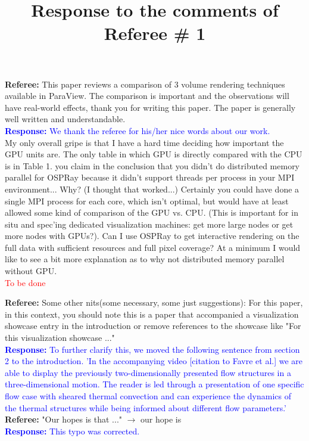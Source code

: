 \documentclass[]{article}
\title{Response to the comments of Referee \# 1}
\begin{document}
\maketitle
\textbf{Referee:} This paper reviews a comparison of 3 volume rendering techniques available in ParaView. The comparison is important and the observations will have real-world effects, thank you for writing this paper. The paper is generally well written and understandable. \\
\textcolor{blue}{\textbf{Response:} We thank the referee for his/her nice words about our work. } \\

My only overall gripe is that I have a hard time deciding how important the GPU units are. The only table in which GPU is directly compared with the CPU is in Table 1. you claim in the conclusion that you didn't do distributed memory parallel for OSPRay because it didn't support threads per process in your MPI environment... Why? (I thought that worked...) Certainly you could have done a single MPI process for each core, which isn't optimal, but would have at least allowed some kind of comparison of the GPU vs. CPU.  (This is important for in situ and spec'ing dedicated visualization machines: get more large nodes or get more nodes with GPUs?). Can I use OSPRay to get interactive rendering on the full data with sufficient resources and full pixel coverage? At a minimum I would like to see a bit more explanation as to why not distributed memory parallel without GPU.\\
\textcolor{red}{To be done}

\textbf{Referee:} Some other nits(some necessary, some just suggestions):
For this paper, in this context, you should note this is a paper that accompanied a visualization showcase entry in the introduction or remove references to the showcase like "For this visualization showcase ..." \\
\textcolor{blue}{\textbf{Response:} To further clarify this, we moved the following sentence from section 2 to the introduction. 'In the accompanying video [citation to Favre et al.] we are able to display the previously two-dimensionally presented flow structures in a three-dimensional motion. The reader is led through a presentation of one specific flow case with sheared thermal convection and can experience the dynamics of the thermal structures while being informed about different flow parameters.' } \\


\textbf{Referee:} "Our hopes is that ..."  $\rightarrow$ our hope is \\
\textcolor{blue}{\textbf{Response:} This typo was corrected.} \\
\end{document}
